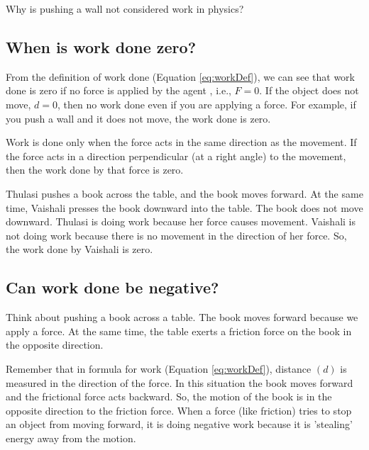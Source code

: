 \documentclass{xtufte-handout}
\begin{document}
 Why is pushing a wall not considered work in physics?
\subsection{When is work done zero?}
From the definition of work done (Equation \ref{eq:workDef}), we can see that work done is zero if no force is applied by the agent , i.e., $F = 0$. If the object does not move, $d = 0$, then no work done even if you are applying a force. For example, if you push a wall and it does not move, the work done is zero.

Work is done only when the force acts in the same direction as the movement. If the force acts in a direction perpendicular (at a right angle) to the movement, then the work done by that force is zero.

 Thulasi pushes a book across the table, and the book moves forward. At the same time, Vaishali presses the book downward into the table. The book does not move downward. Thulasi is doing work because her force causes movement. Vaishali is not doing work because there is no movement in the direction of her force. So, the work done by Vaishali is zero.

\begin{marginfigure}
  \caption{Pushing a book into the table}
  \label{fig:perpendicularForce}
\end{marginfigure}

\subsection{Can work done be negative?}
Think about pushing a book across a table. The book moves forward because we apply a force. At the same time, the table exerts a friction force on the book in the opposite direction.

Remember that in formula for work (Equation \ref{eq:workDef}), distance $(d)$ is measured in the direction of the force. In this situation the book moves forward and the frictional force acts backward. So, the motion of the book is in the opposite direction to the friction force. When a force (like friction) tries to stop an object from moving forward, it is doing negative work because it is 'stealing' energy away from the motion.
\end{document}
